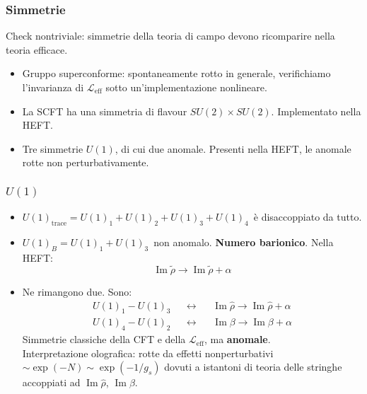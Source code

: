\documentclass[aspectratio=43,mathserif]{beamer}
\newcommand{\hatt}[1]{\ensuremath{\widehat{#1}}}
\newcommand{\tildd}[1]{\ensuremath{\widetilde{#1}}}
\renewcommand{\Im}{\ensuremath{\operatorname{Im}}}
\newcommand{\leff}{\ensuremath{\mathcal{L}_\text{eff}}}
\begin{document}
\begin{frame}
	\frametitle{Simmetrie}
	Check nontriviale: simmetrie della teoria di campo devono ricomparire nella teoria efficace. 
	\begin{itemize}
		\vfill\item Gruppo superconforme: spontaneamente rotto in generale, verifichiamo l'invarianza di $\leff$ sotto un'implementazione nonlineare.
		\vfill\item La SCFT ha una simmetria di flavour $SU(2)\times SU(2)$. Implementato nella HEFT.
		\vfill\item Tre simmetrie $U(1)$, di cui due anomale. Presenti nella HEFT, le anomale rotte non perturbativamente.
	\end{itemize}
\end{frame}


\begin{frame}
	\frametitle{$U(1)$}

	\begin{itemize}
		\vfill\item \small$U(1)_\text{trace} = U(1)_1 + U(1)_2 + U(1)_3 + U(1)_4$\normalsize \, è disaccoppiato da tutto.
		\vfill\item \small$U(1)_B = U(1)_1 + U(1)_3$\normalsize \, non anomalo. \textbf{Numero barionico}. Nella HEFT:
			\begin{equation}
				\Im \tildd \rho \rightarrow \Im \tildd \rho + \alpha
				\label{}
			\end{equation}

		\vfill\vspace{-2pt}\item Ne rimangono due. Sono: \vspace{-4pt}
			\begin{align}
				U(1)_1 - U(1)_3 &&\leftrightarrow && \Im \hatt \rho \rightarrow \Im \hatt \rho + \alpha\\
				U(1)_4 - U(1)_2 &&\leftrightarrow &&\Im\beta \rightarrow \Im\beta + \alpha
			\end{align}
			Simmetrie classiche della CFT e della $\leff$, ma \textbf{anomale}.\\ Interpretazione olografica: rotte da effetti nonperturbativi $\sim \exp(-N) \sim \exp(-1/g_s)$ dovuti a istantoni di teoria delle stringhe accoppiati ad $\Im\hatt\rho$, $\Im\beta$.

	\end{itemize}
\end{frame}
\end{document}
